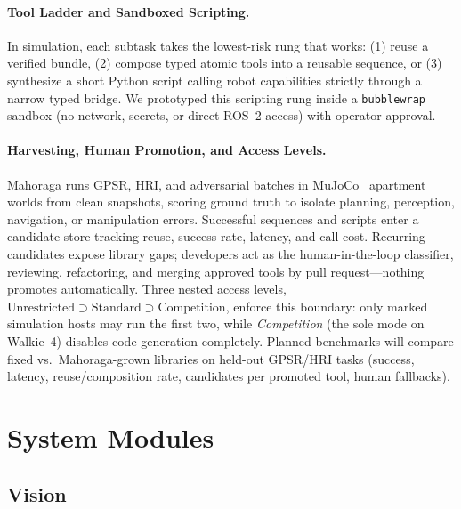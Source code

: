 \documentclass[a4paper]{llncs}
\begin{document}
\paragraph{Tool Ladder and Sandboxed Scripting.}
In simulation, each subtask takes the lowest-risk rung that works: (1) reuse a verified bundle, (2) compose typed atomic tools into a reusable sequence, or (3) synthesize a short Python script calling robot capabilities strictly through a narrow typed bridge. We prototyped this scripting rung inside a \texttt{bubblewrap} sandbox (no network, secrets, or direct ROS~2 access) with operator approval.
  
\paragraph{Harvesting, Human Promotion, and Access Levels.}
Mahoraga runs GPSR, HRI, and adversarial batches in MuJoCo~\cite{todorov2012mujoco} apartment worlds from clean snapshots, scoring ground truth to isolate planning, perception, navigation, or manipulation errors. Successful sequences and scripts enter a candidate store tracking reuse, success rate, latency, and call cost. Recurring candidates expose library gaps; developers act as the human-in-the-loop classifier, reviewing, refactoring, and merging approved tools by pull request---nothing promotes automatically. Three nested access levels, $\text{Unrestricted} \supset \text{Standard} \supset \text{Competition}$, enforce this boundary: only marked simulation hosts may run the first two, while \emph{Competition} (the sole mode on Walkie~4) disables code generation completely. Planned benchmarks will compare fixed vs.\ Mahoraga-grown libraries on held-out GPSR/HRI tasks (success, latency, reuse/composition rate, candidates per promoted tool, human fallbacks).

\section{System Modules}
\label{sec:modules}

\subsection{Vision}
\label{sec:vision}
\end{document}
